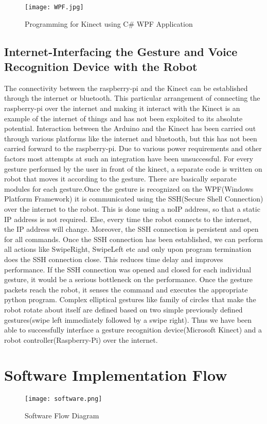 \begin{figure}[H]
  \centering
  \texttt{[image: WPF.jpg]}
  \caption{Programming for Kinect using C\# WPF Application}
  \label{WPF}	
\end{figure}

\subsection{Internet-Interfacing the Gesture and Voice Recognition Device with the Robot}
The connectivity between the raspberry-pi and the Kinect can be established through the internet or bluetooth. This particular arrangement of connecting the raspberry-pi over the internet and making it interact with the Kinect is an example of the internet of things and has not been exploited to its absolute potential. Interaction between the Arduino and the Kinect has been carried out through various platforms like the internet and bluetooth, but this has not been carried forward to the raspberry-pi. Due to various power requirements and other factors most attempts at such an integration have been unsuccessful. 
For every gesture performed by the user in front of the kinect, a separate code is written on robot that moves it according to the gesture. There are basically separate modules for each gesture.Once the gesture is recognized on the WPF(Windows Platform Framework) it is communicated using the SSH(Secure Shell Connection) over the internet to the robot. This is done using a noIP address, so that a static IP address is not required. Else, every time the robot connects to the internet, the IP address will change. Moreover, the SSH connection is persistent and open for all commands. Once the SSH connection has been established, we can perform all actions like SwipeRight, SwipeLeft etc and only upon program termination does the SSH connection close. This reduces time delay and improves performance. If the SSH connection was opened and closed for each individual gesture, it would be a serious bottleneck on the performance. Once the gesture packets reach the robot, it senses the command and executes the appropriate python program. Complex elliptical gestures like family of circles that make the robot rotate about itself are defined based on two simple previously defined gestures(swipe left immediately followed by a swipe right).
Thus we have been able to successfully interface a gesture recognition device(Microsoft Kinect) and a robot controller(Raspberry-Pi) over the internet. 


\section{Software Implementation Flow}

\begin{figure}[H]
  \centering
  \texttt{[image: software.png]}
  \caption{Software Flow Diagram}
  \label{Software Flow}	
\end{figure}

